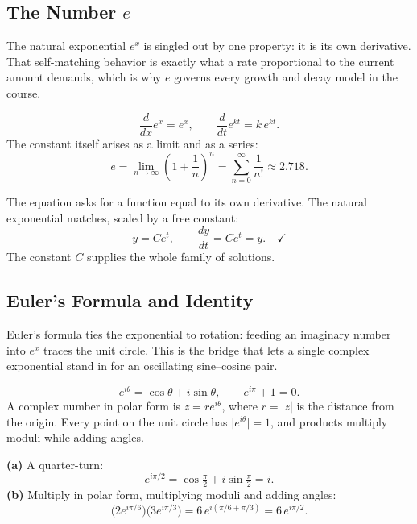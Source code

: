 \subsection{The Number $e$}

The natural exponential $e^{x}$ is singled out by one property: it is its own
derivative. That self-matching behavior is exactly what a rate proportional to
the current amount demands, which is why $e$ governs every growth and decay
model in the course.

\begin{formulabox}
\[
    \frac{d}{dx}e^{x} = e^{x}, \qquad
    \frac{d}{dt}e^{kt} = k\,e^{kt}.
\]
The constant itself arises as a limit and as a series:
\[
    e = \lim_{n\to\infty}\left(1 + \frac{1}{n}\right)^{n}
      = \sum_{n=0}^{\infty}\frac{1}{n!} \approx 2.718.
\]
\end{formulabox}

\begin{examplebox}[Worked Example 1.2: Solve $\frac{dy}{dt} = y$]
The equation asks for a function equal to its own derivative. The natural
exponential matches, scaled by a free constant:
\[ y = Ce^{t}, \qquad \frac{dy}{dt} = Ce^{t} = y. \quad\checkmark \]
The constant $C$ supplies the whole family of solutions.
\end{examplebox}

\subsection{Euler's Formula and Identity}

Euler's formula ties the exponential to rotation: feeding an imaginary number
into $e^{x}$ traces the unit circle. This is the bridge that lets a single
complex exponential stand in for an oscillating sine--cosine pair.

\begin{formulabox}
\[
    e^{i\theta} = \cos\theta + i\sin\theta, \qquad
    e^{i\pi} + 1 = 0.
\]
A complex number in polar form is $z = re^{i\theta}$, where $r = |z|$ is the
distance from the origin. Every point on the unit circle has $\big|e^{i\theta}\big| = 1$,
and products multiply moduli while adding angles.
\end{formulabox}

\begin{examplebox}
\textbf{(a)} A quarter-turn:
\[ e^{i\pi/2} = \cos\tfrac{\pi}{2} + i\sin\tfrac{\pi}{2} = i. \]
\textbf{(b)} Multiply in polar form, multiplying moduli and adding angles:
\[ \big(2e^{i\pi/6}\big)\big(3e^{i\pi/3}\big) = 6\,e^{i(\pi/6 + \pi/3)} = 6\,e^{i\pi/2}. \]
\end{examplebox}

